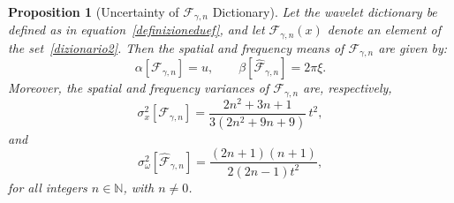 \documentclass[preprint,hidelinks,authoryear]{elsarticle}
\newtheorem{Prop}[Thm]{Proposition}
\theoremstyle{plain}
\theoremstyle{definition}
\theoremstyle{remark}
\begin{document}
\begin{Prop}[Uncertainty of $ \mathcal{F}_{\gamma,n} $ Dictionary]
\label{prop:PV2}
Let the wavelet dictionary be defined as in equation~\eqref{definizioneduef}, and let $ \mathcal{F}_{\gamma,n}(x) $ denote an element of the set~\eqref{dizionario2}. Then the spatial and frequency means of $ \mathcal{F}_{\gamma,n} $ are given by:
$$
\alpha[\mathcal{F}_{\gamma,n}] = u, \qquad \beta[\hat{\mathcal{F}}_{\gamma,n}] = 2\pi \xi.
$$
Moreover, the spatial and frequency variances of $ \mathcal{F}_{\gamma,n} $ are, respectively,
$$
\sigma_x^2[\mathcal{F}_{\gamma,n}] =  \frac{2 n^2+3n+1}{3 \left(2 n^2+9 n+9\right)}\, t^2 ,
$$
and
$$
\sigma_\omega^2[\hat{\mathcal{F}}_{\gamma,n}] = \frac{(2n+1)(n+1)}{2(2n-1)  t^2} ,
$$
for all integers $ n \in \mathbb{N} $, with $ n \ne 0 $.
\end{Prop}
\end{document}
